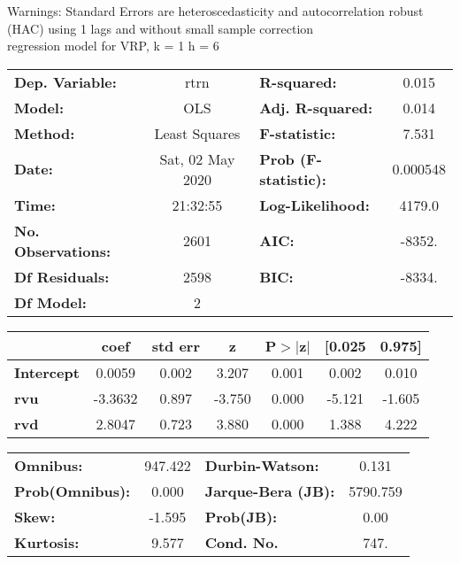 Warnings: \newline
 [1] Standard Errors are heteroscedasticity and autocorrelation robust (HAC) using 1 lags and without small sample correction\\ 

regression model for VRP, k = 1 h = 6\begin{center}
\begin{tabular}{lclc}
\toprule
\textbf{Dep. Variable:}    &       rtrn       & \textbf{  R-squared:         } &     0.015   \\
\textbf{Model:}            &       OLS        & \textbf{  Adj. R-squared:    } &     0.014   \\
\textbf{Method:}           &  Least Squares   & \textbf{  F-statistic:       } &     7.531   \\
\textbf{Date:}             & Sat, 02 May 2020 & \textbf{  Prob (F-statistic):} &  0.000548   \\
\textbf{Time:}             &     21:32:55     & \textbf{  Log-Likelihood:    } &    4179.0   \\
\textbf{No. Observations:} &        2601      & \textbf{  AIC:               } &    -8352.   \\
\textbf{Df Residuals:}     &        2598      & \textbf{  BIC:               } &    -8334.   \\
\textbf{Df Model:}         &           2      & \textbf{                     } &             \\
\bottomrule
\end{tabular}
\begin{tabular}{lcccccc}
                   & \textbf{coef} & \textbf{std err} & \textbf{z} & \textbf{P$> |$z$|$} & \textbf{[0.025} & \textbf{0.975]}  \\
\midrule
\textbf{Intercept} &       0.0059  &        0.002     &     3.207  &         0.001        &        0.002    &        0.010     \\
\textbf{rvu}       &      -3.3632  &        0.897     &    -3.750  &         0.000        &       -5.121    &       -1.605     \\
\textbf{rvd}       &       2.8047  &        0.723     &     3.880  &         0.000        &        1.388    &        4.222     \\
\bottomrule
\end{tabular}
\begin{tabular}{lclc}
\textbf{Omnibus:}       & 947.422 & \textbf{  Durbin-Watson:     } &    0.131  \\
\textbf{Prob(Omnibus):} &   0.000 & \textbf{  Jarque-Bera (JB):  } & 5790.759  \\
\textbf{Skew:}          &  -1.595 & \textbf{  Prob(JB):          } &     0.00  \\
\textbf{Kurtosis:}      &   9.577 & \textbf{  Cond. No.          } &     747.  \\
\bottomrule
\end{tabular}
\end{center}

